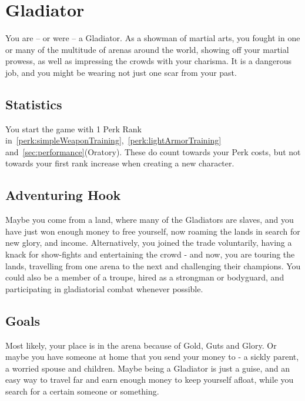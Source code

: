 \section{Gladiator}\label{background:gladiator}
You are -- or were -- a Gladiator.
As a showman of martial arts, you fought in one or many of the multitude of arenas around the world, showing off your martial prowess, as well as impressing the crowds with your charisma.
It is a dangerous job, and you might be wearing not just one scar from your past.

\subsection{Statistics}
You start the game with 1 Perk Rank in~\ref{perk:simpleWeaponTraining},~\ref{perk:lightArmorTraining} and~\ref{sec:performance}(Oratory).
These do count towards your Perk costs, but not towards your first rank increase when creating a new character.

\subsection{Adventuring Hook}
Maybe you come from a land, where many of the Gladiators are slaves, and you have just won enough money to free yourself, now roaming the lands in search for new glory, and income.
Alternatively, you joined the trade voluntarily, having a knack for show-fights and entertaining the crowd - and now, you are touring the lands, travelling from one arena to the next and challenging their champions.
You could also be a member of a troupe, hired as a strongman or bodyguard, and participating in gladiatorial combat whenever possible.

\subsection{Goals}
Most likely, your place is in the arena because of Gold, Guts and Glory.
Or maybe you have someone at home that you send your money to - a sickly parent, a worried spouse and children.
Maybe being a Gladiator is just a guise, and an easy way to travel far and earn enough money to keep yourself afloat, while you search for a certain someone or something.